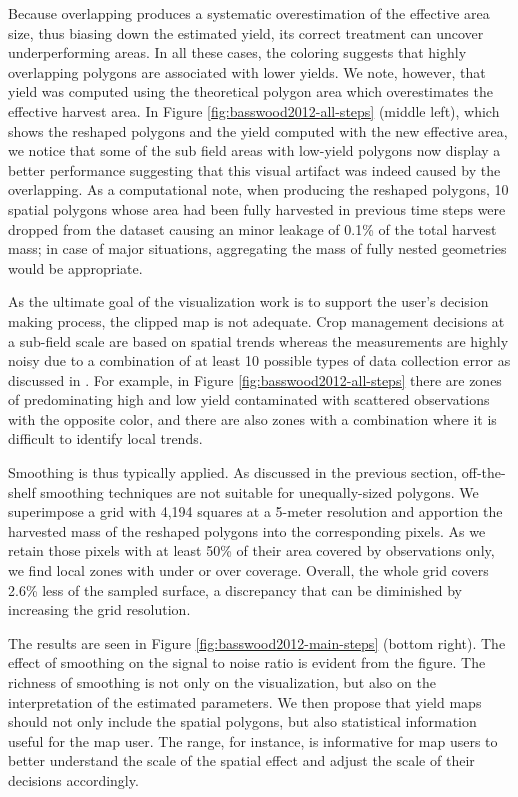 \documentclass[12pt]{article}
\begin{document}
Because overlapping produces a systematic
overestimation of the effective area size, thus biasing down the
estimated yield, its correct treatment can uncover underperforming
areas. In all these cases, the coloring suggests that highly
overlapping polygons are associated with lower yields. We note,
however, that yield was computed using the theoretical polygon area
which overestimates the effective harvest area. In Figure
\ref{fig:basswood2012-all-steps} (middle left), which shows the
reshaped polygons and the yield computed with the new effective area,
we notice that some of the sub field areas with low-yield polygons now
display a better performance suggesting that this visual artifact was
indeed caused by the overlapping. As a computational note, when
producing the reshaped polygons, 10 spatial polygons whose area had
been fully harvested in previous time steps were dropped from the
dataset causing an minor leakage of 0.1\% of the total harvest mass;
in case of major situations, aggregating the mass of fully nested
geometries would be appropriate.

As the ultimate goal of the visualization
work is to support the user's decision making process, the clipped
map is not adequate. Crop management decisions at a sub-field scale
are based on spatial trends whereas the measurements are highly noisy
due to a combination of at least 10 possible types of data collection
error as discussed in \cite{Lyle2013}. For example, in Figure
\ref{fig:basswood2012-all-steps} there are zones of predominating high
and low yield contaminated with scattered observations with the
opposite color, and there are also zones with a combination where it
is difficult to identify local trends.

Smoothing is thus
typically applied. As discussed in the previous section,
off-the-shelf smoothing techniques are not suitable for
unequally-sized polygons. We superimpose a grid with 4,194 squares at
a 5-meter resolution and apportion the harvested mass of the reshaped
polygons into the corresponding pixels. As we retain those pixels with
at least 50\% of their area covered by observations only, we find
local zones with under or over coverage. Overall, the whole grid
covers 2.6\% less of the sampled surface, a discrepancy that can be
diminished by increasing the grid resolution.

The results are seen in Figure
\ref{fig:basswood2012-main-steps} (bottom right). The effect of
smoothing on the signal to noise ratio is evident from the figure. The
richness of smoothing is not only on the visualization, but also on
the interpretation of the estimated parameters. We then propose that
yield maps should not only include the spatial polygons, but also
statistical information useful for the map user. The range, for
instance, is informative for map users to better understand the scale
of the spatial effect and adjust the scale of their decisions
accordingly. %
\end{document}
